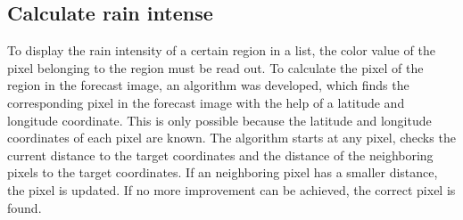 \documentclass[oneside]{htwg-report}
\begin{document}
\subsection*{Calculate rain intense}
    \begin{sloppypar}
        To display the rain intensity of a certain region in a list, the color value of the pixel belonging to the region must be read out. 
        To calculate the pixel of the region in the forecast image, an algorithm was developed, which finds the corresponding pixel in the forecast image with the help of a latitude and longitude coordinate. 
        This is only possible because the latitude and longitude coordinates of each pixel are known. 
        The algorithm starts at any pixel, checks the current distance to the target coordinates and the distance of the neighboring pixels to the target coordinates. 
        If an neighboring pixel has a smaller distance, the pixel is updated. If no more improvement can be achieved, the correct pixel is found. 
    \end{sloppypar}
\end{document}

